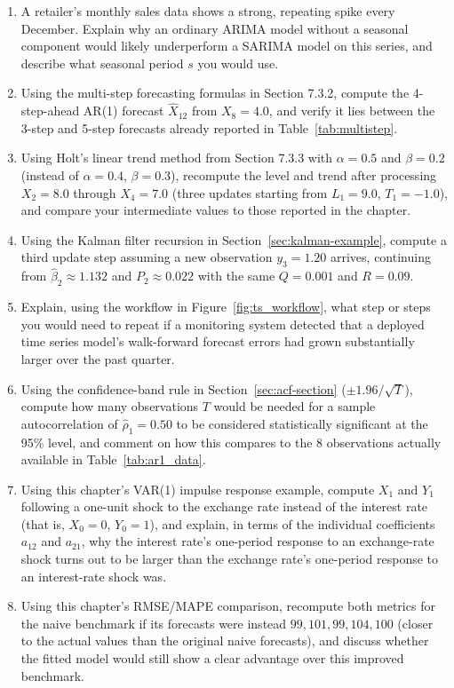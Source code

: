 \documentclass[../ai_in_finance]{subfiles}
\begin{document}
\begin{enumerate}
    \item A retailer's monthly sales data shows a strong, repeating spike every December. Explain why an ordinary ARIMA model without a seasonal component would likely underperform a SARIMA model on this series, and describe what seasonal period $s$ you would use.
    \item Using the multi-step forecasting formulas in Section 7.3.2, compute the 4-step-ahead AR(1) forecast $\hat X_{12}$ from $X_8=4.0$, and verify it lies between the 3-step and 5-step forecasts already reported in Table~\ref{tab:multistep}.
    \item Using Holt's linear trend method from Section 7.3.3 with $\alpha=0.5$ and $\beta=0.2$ (instead of $\alpha=0.4$, $\beta=0.3$), recompute the level and trend after processing $X_2=8.0$ through $X_4=7.0$ (three updates starting from $L_1=9.0$, $T_1=-1.0$), and compare your intermediate values to those reported in the chapter.
    \item Using the Kalman filter recursion in Section~\ref{sec:kalman-example}, compute a third update step assuming a new observation $y_3=1.20$ arrives, continuing from $\hat\beta_2\approx 1.132$ and $P_2\approx 0.022$ with the same $Q=0.001$ and $R=0.09$.
    \item Explain, using the workflow in Figure~\ref{fig:ts_workflow}, what step or steps you would need to repeat if a monitoring system detected that a deployed time series model's walk-forward forecast errors had grown substantially larger over the past quarter.
    \item Using the confidence-band rule in Section~\ref{sec:acf-section} ($\pm 1.96/\sqrt{T}$), compute how many observations $T$ would be needed for a sample autocorrelation of $\hat\rho_1=0.50$ to be considered statistically significant at the 95\% level, and comment on how this compares to the 8 observations actually available in Table~\ref{tab:ar1_data}.
    \item Using this chapter's VAR(1) impulse response example, compute $X_1$ and $Y_1$ following a one-unit shock to the exchange rate instead of the interest rate (that is, $X_0=0$, $Y_0=1$), and explain, in terms of the individual coefficients $a_{12}$ and $a_{21}$, why the interest rate's one-period response to an exchange-rate shock turns out to be larger than the exchange rate's one-period response to an interest-rate shock was.
    \item Using this chapter's RMSE/MAPE comparison, recompute both metrics for the naive benchmark if its forecasts were instead $99, 101, 99, 104, 100$ (closer to the actual values than the original naive forecasts), and discuss whether the fitted model would still show a clear advantage over this improved benchmark.

\end{enumerate}
\end{document}
